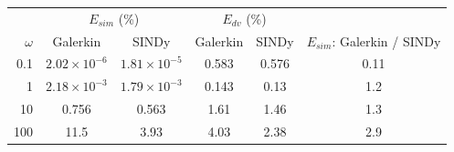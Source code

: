 \begin{tabular}{r|cc|cc|c}\toprule
 & \multicolumn{2}{c|}{$E_{sim}$ (\%)} & \multicolumn{2}{c|}{$E_{dv}$ (\%)} & \\
$\omega$ & Galerkin & SINDy & Galerkin & SINDy & $E_{sim}$: Galerkin / SINDy\\\midrule
0.1 & $2.02\!\times\!10^{-6}$ & $1.81\!\times\!10^{-5}$ & 0.583 & 0.576 & 0.11\\
1 & $2.18\!\times\!10^{-3}$ & $1.79\!\times\!10^{-3}$ & 0.143 & 0.13 & 1.2\\
10 & 0.756 & 0.563 & 1.61 & 1.46 & 1.3\\
100 & 11.5 & 3.93 & 4.03 & 2.38 & 2.9\\
\bottomrule\end{tabular}